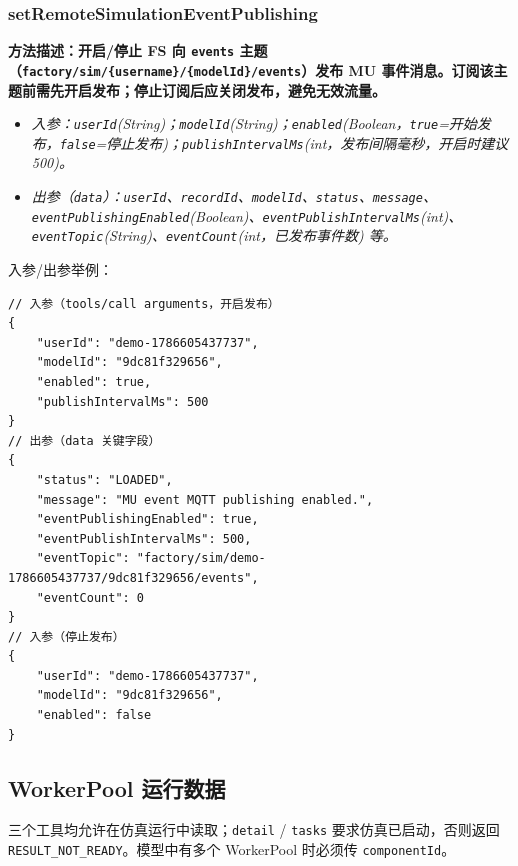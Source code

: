 \subsubsection{setRemoteSimulationEventPublishing}
\bf{方法描述}：开启/停止 FS 向 \texttt{events} 主题（\texttt{factory/sim/\{username\}/\{modelId\}/events}）发布 MU 事件消息。订阅该主题前需先开启发布；停止订阅后应关闭发布，避免无效流量。
\begin{itemize}
	\item \it{入参}：\texttt{userId}(String)；\texttt{modelId}(String)；\texttt{enabled}(Boolean，\texttt{true}=开始发布，\texttt{false}=停止发布)；\texttt{publishIntervalMs}(int，发布间隔毫秒，开启时建议 500)。
	\item \it{出参}（\texttt{data}）：\texttt{userId}、\texttt{recordId}、\texttt{modelId}、\texttt{status}、\texttt{message}、\texttt{eventPublishingEnabled}(Boolean)、\texttt{eventPublishIntervalMs}(int)、\texttt{eventTopic}(String)、\texttt{eventCount}(int，已发布事件数) 等。
\end{itemize}
入参/出参举例：
\begin{lstlisting}
// 入参（tools/call arguments，开启发布）
{
    "userId": "demo-1786605437737",
    "modelId": "9dc81f329656",
    "enabled": true,
    "publishIntervalMs": 500
}
// 出参（data 关键字段）
{
    "status": "LOADED",
    "message": "MU event MQTT publishing enabled.",
    "eventPublishingEnabled": true,
    "eventPublishIntervalMs": 500,
    "eventTopic": "factory/sim/demo-1786605437737/9dc81f329656/events",
    "eventCount": 0
}
// 入参（停止发布）
{
    "userId": "demo-1786605437737",
    "modelId": "9dc81f329656",
    "enabled": false
}
\end{lstlisting}\vspace{-30pt}

\subsection{WorkerPool 运行数据}
三个工具均允许在仿真运行中读取；\texttt{detail} / \texttt{tasks} 要求仿真已启动，否则返回 \texttt{RESULT\_NOT\_READY}。模型中有多个 WorkerPool 时必须传 \texttt{componentId}。

